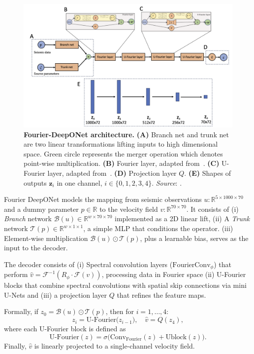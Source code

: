 \documentclass{article}
\begin{document}
\begin{figure}
    \centering
    \includegraphics[width=0.8\linewidth]{figures/FDONet.png}
    \caption{\textbf{Fourier-DeepONet architecture.} 
    \textbf{(A)} Branch net and trunk net are two linear transformations lifting inputs to high dimensional space. Green circle represents the merger operation which denotes point-wise multiplication. 
    \textbf{(B)} Fourier layer, adapted from~\cite{li2020fourier}. 
    \textbf{(C)} U-Fourier layer, adapted from~\cite{wen2022u}. 
    \textbf{(D)} Projection layer $Q$. 
    \textbf{(E)} Shapes of outputs $\mathbf{z}_i$ in one channel, $i \in \{0,1,2,3,4\}$.
    \emph{Source}: \cite{fdonet}.}
    \label{fig:fdonet}
\end{figure}

Fourier DeepONet models the mapping from seismic observations \(u: \mathbb{R}^{5 \times 1000 \times 70}\) and a dummy parameter \(p\in\mathbb{R}\) to the velocity field \(v:\mathbb{R}^{70\times70}\). It consists of (i) \emph{Branch} network \(\mathcal{B}(u)\in \mathbb{R}^{w\times70\times70}\) implemented as a 2D linear lift, (ii) A \emph{Trunk} network \(\mathcal{T}(p)\in \mathbb{R}^{w\times1\times1}\), a simple MLP that conditions the operator. (iii) Element-wise multiplication \(\mathcal{B}(u)\odot\mathcal{T}(p)\), plus a learnable bias, serves as the input to the decoder.

The decoder consists of (i) Spectral convolution layers (\(\text{FourierConv}_\phi\)) that perform \(\hat v = \mathcal{F}^{-1}(R_\phi \cdot \mathcal{F}(v))\), processing data in Fourier space (ii) U-Fourier blocks that combine spectral convolutions with spatial skip connections via mini U-Nets and (iii) a projection layer \(Q\) that refines the feature maps.

Formally, if \(z_0 = \mathcal{B}(u)\odot\mathcal{T}(p)\), then for \(i=1,\dots,4\):
\[
z_i = \text{U-Fourier}\bigl(z_{i-1}\bigr),\quad
\hat{v} = Q(z_4),
\]
where each U-Fourier block is defined as
\[
\text{U-Fourier}(z) = \sigma\bigl(\text{Conv}_\text{Fourier}(z) + \text{Ublock}(z)\bigr).
\]
Finally, \(\hat v\) is linearly projected to a single-channel velocity field.
\end{document}
